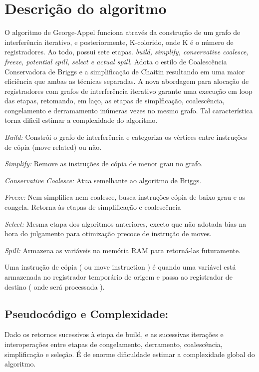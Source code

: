 \section{Descrição do algoritmo}

O algoritmo de George-Appel funciona através da construção de um grafo de interferência iterativo, e posteriormente, K-colorido, onde K é o número de registradores. Ao todo, possui sete etapas.\textit{ build, simplify, conservative coalesce, freeze, potential spill, select e actual spill}. Adota o estilo de Coalescência Conservadora de Briggs e a simplificação de Chaitin resultando em uma maior eficiência que ambas as técnicas separadas. A nova abordagem para alocação de registradores com grafos de interferência iterativo garante uma execução em loop das etapas, retomando, em laço, as etapas de simplficação, coalescência, congelamento e derramamento inúmeras vezes no mesmo grafo. Tal característica torna dificil estimar a complexidade do algoritmo.



\textit{Build:} Constrói o grafo de interferência e categoriza os vértices entre instruções de cópia (move related) ou não.


\textit{Simplify:}  Remove as instruções de cópia de menor grau no grafo.


\textit{Conservative Coalesce:} Atua semelhante ao algoritmo de Briggs.

\textit{Freeze: } Nem simplifica nem coalesce, busca instruções cópia de baixo grau e as congela. Retorna às etapas de simplificação e coalescência

\textit{Select: } Mesma etapa dos algoritmos anteriores, exceto que não adotada bias na hora do julgamento para otimização precoce de instrução de moves.

\textit{Spill: } Armazena as variáveis na memória RAM para retorná-las futuramente.

Uma instrução de cópia ( ou move instruction ) é quando uma variável está armazenada no registrador temporário de origem e passa ao registrador de destino ( onde será processada ).

\subsection{Pseudocódigo e Complexidade: }

Dado os retornos sucessivos à etapa de build, e as sucessivas iterações e interoperações entre etapas de congelamento, derramento, coalescência, simplificação e seleção. É de enorme dificuldade estimar a complexidade global do algoritmo.

